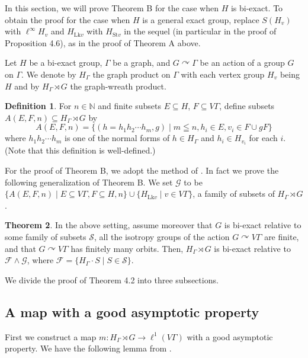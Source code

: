 \documentclass{amsart}
\theoremstyle{definition}
\newtheorem{theorem}{Theorem}[section]
\newtheorem{definition}[theorem]{Definition}
\renewcommand{\subset}{\subseteq}
\newcommand{\action}{\curvearrowright}
\begin{document}
In this section, we will prove Theorem B for the case when $H$ is bi-exact. 
To obtain the proof for the case when $H$ is a general exact group, 
replace $S(H_v)$ with $\ell^{\infty}H_v$ and
$H_{\mathrm{Lk}v}$ with $H_{\mathrm{St}v}$ in the sequel (in particular in the proof of Proposition 4.6), 
as in the proof of Theorem A above. 

Let $H$ be a bi-exact group, $\Gamma$ be a graph, and $G\curvearrowright \Gamma$ be an action of a group $G$ on $\Gamma$. 
We denote by $H_{\Gamma}$ the graph product on $\Gamma$ with each vertex group $H_v$ being $H$ and by $H_{\Gamma}\rtimes G$ the graph-wreath product. 

\begin{definition}
For $n\in \mathbb{N}$ and finite subsets $E\subset H$, $F\subset V\Gamma$, define subsets $A(E,F,n)\subset H_{\Gamma}\rtimes G$ by
\[
A(E,F,n)=\{ (h=h_1h_2\cdots h_m, g) \mid m\leqq n, h_i\in E, v_i\in F\cup gF\}
\]
where $h_1h_2\cdots h_m$ is one of the normal forms of $h\in H_{\Gamma}$ and $h_i\in H_{v_i}$ for each $i$.
(Note that this definition is well-defined.)
\end{definition}

For the proof of Theorem B, we adopt the method of \cite[Theorem 5.2]{hik}.  In fact we prove the following generalization of Theorem B. 
We set $\mathcal{G}$ to be $\{ A(E, F, n) \mid E\subset V\Gamma, F\subset H, n\} \cup\{ H_{\mathrm{Lk}v}\mid v\in V\Gamma\}$, a family of subsets of $H_{\Gamma}\rtimes G$. 

\begin{theorem}
In the above setting, assume moreover that $G$ is bi-exact relative to some family of subsets $\mathcal{S}$, all the isotropy groups of the action $G\action V\Gamma$ are finite, and that $G\action V\Gamma$ has finitely many orbits. Then, $H_{\Gamma}\rtimes G$ is bi-exact relative to $\mathcal{F}\wedge\mathcal{G}$, where $\mathcal{F}=\{ H_{\Gamma}\cdot S\mid S\in \mathcal{S}\}$. 
\end{theorem}

We divide the proof of Theorem 4.2 into three subsections. 

\subsection{A map with a good asymptotic property}

First we construct a map $m : H_{\Gamma}\rtimes G\to \ell^1(V\Gamma)$ with a good asymptotic property. We have the following lemma from \cite[Lemma 4.3]{hik}. 
\end{document}
